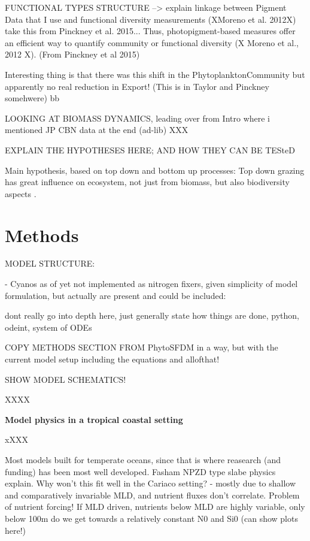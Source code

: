 FUNCTIONAL TYPES STRUCTURE --> explain linkage between Pigment Data that I use and functional diversity measurements (XMoreno et al. 2012X) take this from Pinckney et al. 2015...
Thus, photopigment-based measures offer an efficient way to quantify community or functional diversity (X Moreno et al., 2012 X). (From Pinckney et al 2015)

Interesting thing is that there was this shift in the PhytoplanktonCommunity but apparently no real reduction in Export! (This is in Taylor and Pinckney somehwere)
bb


LOOKING AT BIOMASS DYNAMICS, leading over from Intro where i mentioned JP CBN data at the end (ad-lib)
XXX

EXPLAIN THE HYPOTHESES HERE; AND HOW THEY CAN BE TESteD

Main hypothesis, based on top down and bottom up processes:
Top down grazing has great influence on ecosystem, not just from biomass, but also biodiversity aspects \cite{Prowe2012c}.


\section{Methods}

MODEL STRUCTURE: 

- Cyanos as of yet not implemented as nitrogen fixers, given simplicity of model formulation, but actually are present and could be included: \citep{Montes2013}

dont really go into depth here, just generally state how things are done, python, odeint, system of ODEs

COPY METHODS SECTION FROM PhytoSFDM in a way, but with the current model setup
including the equations and allofthat!

SHOW MODEL SCHEMATICS!

XXXX

\small {\textbf{Model physics in a tropical coastal setting}}

xXXX

Most models built for temperate oceans, since that is where reasearch (and funding) has been most well developed. Fasham NPZD type slabe physics explain.
Why won't this fit well in the Cariaco setting? - mostly due to shallow and comparatively invariable MLD, and nutrient fluxes don't correlate.
Problem of nutrient forcing! If MLD driven, nutrients below MLD are highly variable, only below 100m do we get towards a relatively constant N0 and Si0 (can show plots here!)


